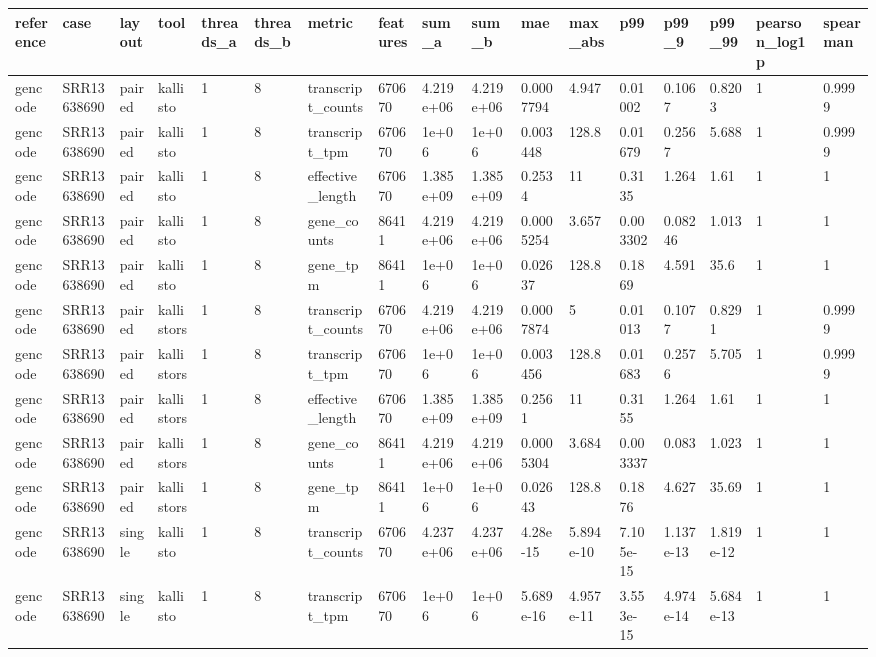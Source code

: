 \begin{tabular}{lllllllllllllllll}
\toprule
reference & case & layout & tool & threads\_a & threads\_b & metric & features & sum\_a & sum\_b & mae & max\_abs & p99 & p99\_9 & p99\_99 & pearson\_log1p & spearman \\
\midrule
gencode & SRR13638690 & paired & kallisto & 1 & 8 & transcript\_counts & 670670 & 4.219e+06 & 4.219e+06 & 0.0007794 & 4.947 & 0.01002 & 0.1067 & 0.8203 & 1 & 0.9999 \\
gencode & SRR13638690 & paired & kallisto & 1 & 8 & transcript\_tpm & 670670 & 1e+06 & 1e+06 & 0.003448 & 128.8 & 0.01679 & 0.2567 & 5.688 & 1 & 0.9999 \\
gencode & SRR13638690 & paired & kallisto & 1 & 8 & effective\_length & 670670 & 1.385e+09 & 1.385e+09 & 0.2534 & 11 & 0.3135 & 1.264 & 1.61 & 1 & 1 \\
gencode & SRR13638690 & paired & kallisto & 1 & 8 & gene\_counts & 86411 & 4.219e+06 & 4.219e+06 & 0.0005254 & 3.657 & 0.003302 & 0.08246 & 1.013 & 1 & 1 \\
gencode & SRR13638690 & paired & kallisto & 1 & 8 & gene\_tpm & 86411 & 1e+06 & 1e+06 & 0.02637 & 128.8 & 0.1869 & 4.591 & 35.6 & 1 & 1 \\
gencode & SRR13638690 & paired & kallistors & 1 & 8 & transcript\_counts & 670670 & 4.219e+06 & 4.219e+06 & 0.0007874 & 5 & 0.01013 & 0.1077 & 0.8291 & 1 & 0.9999 \\
gencode & SRR13638690 & paired & kallistors & 1 & 8 & transcript\_tpm & 670670 & 1e+06 & 1e+06 & 0.003456 & 128.8 & 0.01683 & 0.2576 & 5.705 & 1 & 0.9999 \\
gencode & SRR13638690 & paired & kallistors & 1 & 8 & effective\_length & 670670 & 1.385e+09 & 1.385e+09 & 0.2561 & 11 & 0.3155 & 1.264 & 1.61 & 1 & 1 \\
gencode & SRR13638690 & paired & kallistors & 1 & 8 & gene\_counts & 86411 & 4.219e+06 & 4.219e+06 & 0.0005304 & 3.684 & 0.003337 & 0.083 & 1.023 & 1 & 1 \\
gencode & SRR13638690 & paired & kallistors & 1 & 8 & gene\_tpm & 86411 & 1e+06 & 1e+06 & 0.02643 & 128.8 & 0.1876 & 4.627 & 35.69 & 1 & 1 \\
gencode & SRR13638690 & single & kallisto & 1 & 8 & transcript\_counts & 670670 & 4.237e+06 & 4.237e+06 & 4.28e-15 & 5.894e-10 & 7.105e-15 & 1.137e-13 & 1.819e-12 & 1 & 1 \\
gencode & SRR13638690 & single & kallisto & 1 & 8 & transcript\_tpm & 670670 & 1e+06 & 1e+06 & 5.689e-16 & 4.957e-11 & 3.553e-15 & 4.974e-14 & 5.684e-13 & 1 & 1 \\

\end{tabular}
